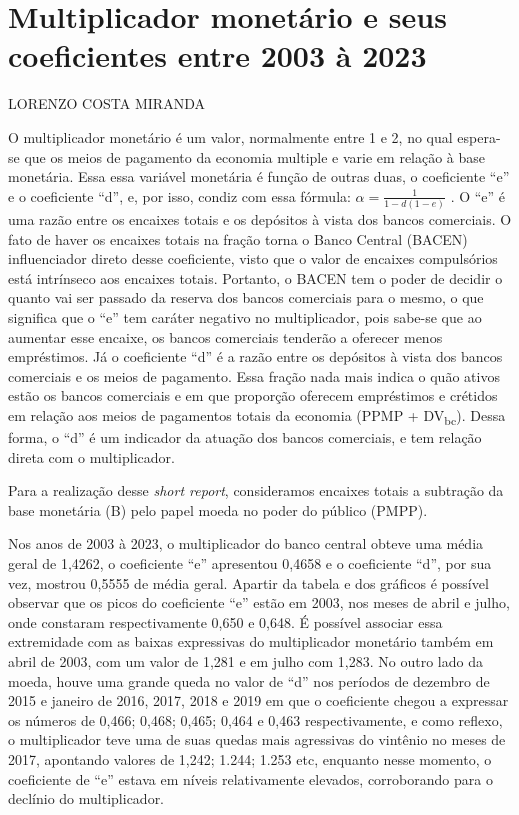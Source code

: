 \documentclass[12pt]{article}
\author{Lorenzo Costa Miranda}
\date{} %
\begin{document}
\section*{Multiplicador monetário e seus coeficientes entre 2003 à 2023}
\hspace{4.5cm} LORENZO COSTA MIRANDA
\vspace*{5pt}



O multiplicador monetário é um valor, normalmente entre 1 e 2, no qual
espera-se que os meios de pagamento da economia multiple e varie em
relação à base monetária. Essa essa variável monetária é função de
outras duas, o coeficiente ``e'' e o coeficiente ``d'', e, por isso,
condiz com essa fórmula: \(\alpha = \frac{1}{1-d(1-e)}\) . O ``e'' é uma
razão entre os encaixes totais e os depósitos à vista dos bancos
comerciais. O fato de haver os encaixes totais na fração torna o Banco
Central (BACEN) influenciador direto desse coeficiente, visto que o
valor de encaixes compulsórios está intrínseco aos encaixes totais.
Portanto, o BACEN tem o poder de decidir o quanto vai ser passado da
reserva dos bancos comerciais para o mesmo, o que significa que o ``e''
tem caráter negativo no multiplicador, pois sabe-se que ao aumentar esse
encaixe, os bancos comerciais tenderão a oferecer menos empréstimos. Já
o coeficiente ``d'' é a razão entre os depósitos à vista dos bancos
comerciais e os meios de pagamento. Essa fração nada mais indica o quão
ativos estão os bancos comerciais e em que proporção oferecem
empréstimos e crétidos em relação aos meios de pagamentos totais da
economia (PPMP + DV\textsubscript{bc}). Dessa forma, o ``d'' é um
indicador da atuação dos bancos comerciais, e tem relação direta com o
multiplicador.

Para a realização desse \textit{short report}, consideramos encaixes
totais a subtração da base monetária (B) pelo papel moeda no poder do
público (PMPP).

Nos anos de 2003 à 2023, o multiplicador do banco central obteve uma
média geral de 1,4262, o coeficiente ``e'' apresentou 0,4658 e o
coeficiente ``d'', por sua vez, mostrou 0,5555 de média geral. Apartir
da tabela e dos gráficos é possível observar que os picos do coeficiente
``e'' estão em 2003, nos meses de abril e julho, onde constaram
respectivamente 0,650 e 0,648. É possível associar essa extremidade com
as baixas expressivas do multiplicador monetário também em abril de
2003, com um valor de 1,281 e em julho com 1,283. No outro lado da
moeda, houve uma grande queda no valor de ``d'' nos períodos de dezembro
de 2015 e janeiro de 2016, 2017, 2018 e 2019 em que o coeficiente chegou
a expressar os números de 0,466; 0,468; 0,465; 0,464 e 0,463
respectivamente, e como reflexo, o multiplicador teve uma de suas quedas
mais agressivas do vintênio no meses de 2017, apontando valores de
1,242; 1.244; 1.253 etc, enquanto nesse momento, o coeficiente de ``e''
estava em níveis relativamente elevados, corroborando para o declínio do
multiplicador.
\end{document}

